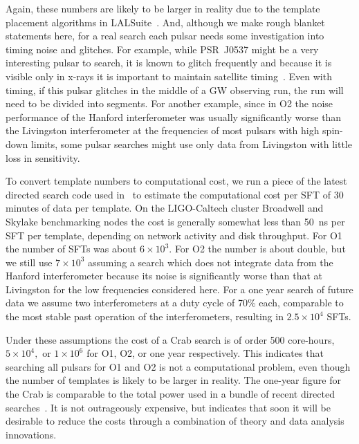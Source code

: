 \documentclass{ttuthes2007}
\begin{document}
Again, these numbers are likely to be larger in reality due to the template
placement algorithms in LALSuite~\cite{LALSuite}.
And, although we make rough blanket statements here, for a real search each
pulsar needs some investigation into timing noise and glitches.
For example, while PSR~J0537 might be a very interesting pulsar
to search, it is known to glitch frequently and because it is visible only in
x-rays it is important to maintain satellite timing~\cite{Andersson:2017fow}.
Even with timing, if this pulsar glitches in the middle of a \ac{GW} observing
run, the run will need to be divided into segments.
For another example, since in \ac{O2} the noise performance of the Hanford
interferometer was usually significantly worse than the Livingston
interferometer at the frequencies of most pulsars with high spin-down limits,
some pulsar searches might use only data from Livingston with little loss in
sensitivity.

To convert template numbers to computational cost, we run a piece of the
latest directed search code used in~\cite{Abbott:2018qee} to estimate the
computational cost per \ac{SFT} of 30 minutes of data per template.
On the LIGO-Caltech cluster Broadwell and Skylake benchmarking nodes the cost
is generally somewhat less than 50~ns per \ac{SFT} per template, depending on
network activity and disk throughput.
For \ac{O1} the number of \acp{SFT} was about $6\times10^3.$
For \ac{O2} the number is about double, but we still use $7\times10^3$
assuming a search which does not integrate data from the Hanford
interferometer because its noise is significantly worse than that at
Livingston for the low frequencies considered here.
For a one year search of future data we assume two interferometers at a duty
cycle of 70\% each, comparable to the most stable past operation of the
interferometers, resulting in $2.5\times10^4$ \acp{SFT}.

Under these assumptions the cost of a Crab search is of order 500 core-hours,
$5\times10^4,$ or $1\times10^6$ for \ac{O1}, \ac{O2}, or one year
respectively.
This indicates that searching all pulsars for \ac{O1} and \ac{O2} is not a
computational problem, even though the number of templates is likely to be
larger in reality.
The one-year figure for the Crab is comparable to the total power used in a
bundle of recent directed searches~\cite{Abbott:2018qee}.
It is not outrageously expensive, but indicates that soon it will be desirable
to reduce the costs through a combination of theory and data analysis
innovations.
\end{document}
